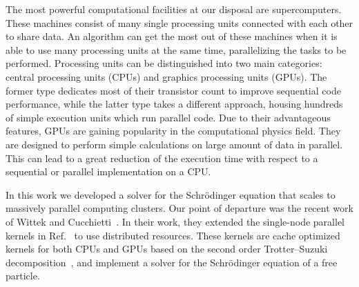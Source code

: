 The most powerful computational facilities at our disposal are supercomputers. These machines consist of many single processing units connected with each other to share data. An algorithm can get the most out of these machines when it is able to use many processing units at the same time, parallelizing the tasks to be performed. Processing units can be distinguished into two main categories: central processing units (CPUs) and graphics processing units (GPUs). The former type dedicates most of their transistor count to improve sequential code performance, while the latter type takes a different approach, housing hundreds of simple execution units which run parallel code. Due to their advantageous features, GPUs are gaining popularity in the computational physics field. They are designed to perform simple calculations on large amount of data in parallel. This can lead to a great reduction of the execution time with respect to a sequential or parallel implementation on a CPU.


In this work we developed a solver for the Schr\"odinger equation that scales to	massively parallel computing clusters. Our point of departure was the recent work of Wittek and Cucchietti~\citep{Wittek20131165}. In their work, they extended the single-node parallel kernels in Ref.~\citep{bederian2011boosting} to use distributed resources. These kernels are cache optimized kernels for both CPUs and GPUs based on the second order Trotter--Suzuki decomposition~\citep{Suzuki1992387}, and implement a solver for the Schr\"odinger equation of a free particle. 

